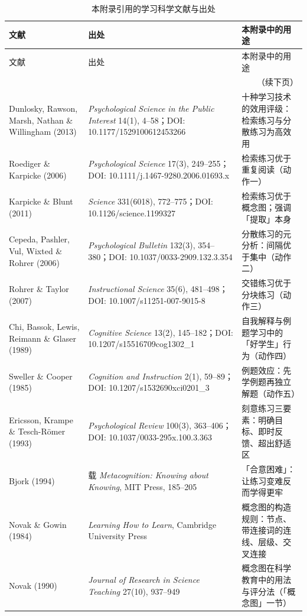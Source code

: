 \normalsize
{\small
\begin{longtable}{@{}p{4.4cm}p{5.2cm}p{5.2cm}@{}}
\caption{本附录引用的学习科学文献与出处}\label{tab:app-i-refs}\\
\toprule
文献 & 出处 & 本附录中的用途 \\
\midrule
\endfirsthead
\toprule
文献 & 出处 & 本附录中的用途 \\
\midrule
\endhead
\midrule
\multicolumn{3}{r}{\small（续下页）}\\
\endfoot
\bottomrule
\endlastfoot
Dunlosky, Rawson, Marsh, Nathan \& Willingham (2013) & \textit{Psychological Science in the Public Interest} 14(1), 4--58；DOI: 10.1177/1529100612453266 & 十种学习技术的效用评级：检索练习与分散练习为高效用 \\
Roediger \& Karpicke (2006) & \textit{Psychological Science} 17(3), 249--255；DOI: 10.1111/j.1467-9280.2006.01693.x & 检索练习优于重复阅读（动作一） \\
Karpicke \& Blunt (2011) & \textit{Science} 331(6018), 772--775；DOI: 10.1126/science.1199327 & 检索练习优于概念图；强调「提取」本身 \\
Cepeda, Pashler, Vul, Wixted \& Rohrer (2006) & \textit{Psychological Bulletin} 132(3), 354--380；DOI: 10.1037/0033-2909.132.3.354 & 分散练习的元分析：间隔优于集中（动作二） \\
Rohrer \& Taylor (2007) & \textit{Instructional Science} 35(6), 481--498；DOI: 10.1007/s11251-007-9015-8 & 交错练习优于分块练习（动作三） \\
Chi, Bassok, Lewis, Reimann \& Glaser (1989) & \textit{Cognitive Science} 13(2), 145--182；DOI: 10.1207/s15516709cog1302\_1 & 自我解释与例题学习中的「好学生」行为（动作四） \\
Sweller \& Cooper (1985) & \textit{Cognition and Instruction} 2(1), 59--89；DOI: 10.1207/s1532690xci0201\_3 & 例题效应：先学例题再独立解题（动作五） \\
Ericsson, Krampe \& Tesch-R\"omer (1993) & \textit{Psychological Review} 100(3), 363--406；DOI: 10.1037/0033-295x.100.3.363 & 刻意练习三要素：明确目标、即时反馈、超出舒适区 \\
Bjork (1994) & 载 \textit{Metacognition: Knowing about Knowing}, MIT Press, 185--205 & 「合意困难」：让练习变难反而学得更牢 \\
Novak \& Gowin (1984) & \textit{Learning How to Learn}, Cambridge University Press & 概念图的构造规则：节点、带连接词的连线、层级、交叉连接 \\
Novak (1990) & \textit{Journal of Research in Science Teaching} 27(10), 937--949 & 概念图在科学教育中的用法与评分法（「概念图」一节） \\

\end{longtable}}
